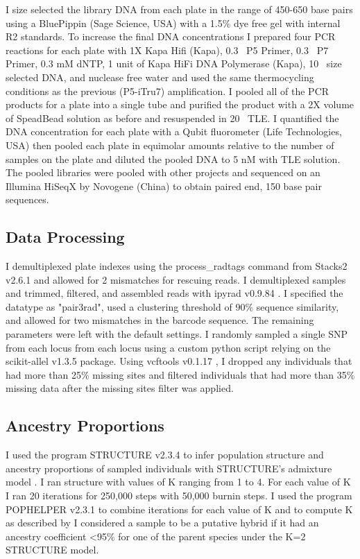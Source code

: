 I size selected the library DNA from each plate in the range of 450-650 base pairs using
a BluePippin (Sage Science, USA) with a 1.5\% dye free gel with internal R2 standards. 
To increase the final DNA concentrations I prepared four PCR reactions for each 
plate with 1X Kapa Hifi (Kapa), 0.3 \uM\ P5 Primer, 0.3 \uM\ P7 Primer, 0.3 mM dNTP, 
1 unit of Kapa HiFi DNA Polymerase (Kapa), 10 \uL\ size selected DNA, and 
nuclease free water and used the same thermocycling conditions as the previous
(P5-iTru7) amplification.
I pooled all of the PCR products for a plate into a single tube and purified 
the product with a 2X volume of SpeadBead solution as before and resuspended in 20 \uL\ TLE. 
I quantified the DNA concentration for each plate with a Qubit fluorometer 
(Life Technologies, USA) then pooled each plate in equimolar amounts relative 
to the number of samples on the plate and diluted the pooled DNA to 5 nM with
TLE solution. 
The pooled libraries were pooled with other projects and sequenced on an Illumina 
HiSeqX by Novogene (China) to obtain paired end, 150 base pair sequences. 

\subsection{Data Processing}

I demultiplexed plate indexes using the process\_radtags command from 
Stacks2 v2.6.1 \parencite{rochette2019} and allowed for 2 mismatches for rescuing reads. 
I demultiplexed samples and trimmed, filtered, and assembled reads with 
ipyrad v0.9.84 \parencite{eaton2020}. I specified the datatype as "pair3rad", 
used a clustering threshold of 90\% sequence similarity, and allowed for two  
mismatches in the barcode sequence. The remaining parameters were left with the 
default settings.
I randomly sampled a single SNP from each locus from each locus using a  
custom python script relying on the scikit-allel v1.3.5 package.
Using vcftools v0.1.17 \parencite{danecek2011}, I dropped any individuals that 
had more than 25\% missing sites and filtered individuals that had more than 
35\% missing data after the missing sites filter was applied. 

\subsection{Ancestry Proportions}
I used the program STRUCTURE v2.3.4 \parencite{pritchard2000} to infer population structure and ancestry 
proportions of sampled individuals with STRUCTURE's admixture model .
I ran structure with values of K ranging from 1 to 4. For each value of K I 
ran 20 iterations for 250,000 steps with 50,000 burnin steps. 
I used the program POPHELPER v2.3.1 \parencite{francis2017} to combine
iterations for each value of K and to compute \Delta K as described by \parencite{evanno2005}
I considered a sample to be a putative hybrid if it had an ancestry coefficient
<95\% for one of the parent species under the K=2 STRUCTURE model.


